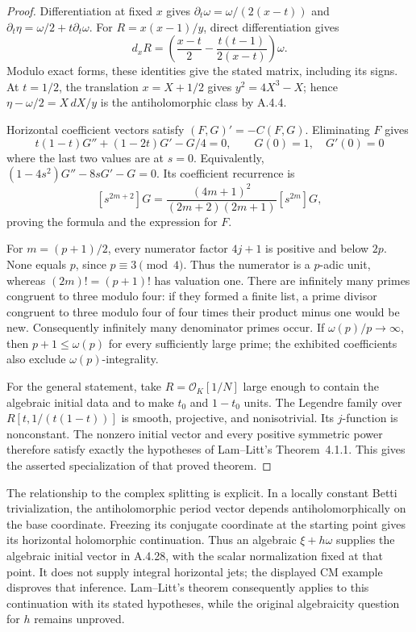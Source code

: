 \begin{proof}
Differentiation at fixed $x$ gives
$\partial_t\omega=\omega/(2(x-t))$ and
$\partial_t\eta=\omega/2+t\partial_t\omega$.
For $R=x(x-1)/y$, direct differentiation gives
\[
 d_xR=\left(\frac{x-t}{2}
       -\frac{t(t-1)}{2(x-t)}\right)\omega.
\]
Modulo exact forms, these identities give the stated matrix, including its signs.
At $t=1/2$, the translation $x=X+1/2$ gives $y^2=4X^3-X$; hence $\eta-\omega/2=X\,dX/y$ is the antiholomorphic class by A.4.4.

Horizontal coefficient vectors satisfy $(F,G)'=-C(F,G)$. Eliminating $F$ gives
\[
 t(1-t)G''+(1-2t)G'-G/4=0,
 \qquad G(0)=1,\quad G'(0)=0
\]
where the last two values are at $s=0$. Equivalently,
$(1-4s^2)G''-8sG'-G=0$. Its coefficient recurrence is
\[
 [s^{2m+2}]G=\frac{(4m+1)^2}{(2m+2)(2m+1)}[s^{2m}]G,
\]
proving the formula and the expression for $F$.

For $m=(p+1)/2$, every numerator factor $4j+1$ is positive and below $2p$. None equals $p$, since $p\equiv3\pmod4$. Thus the numerator is a $p$-adic unit, whereas $(2m)!=(p+1)!$ has valuation one. There are infinitely many primes congruent to three modulo four: if they formed a finite list, a prime divisor congruent to three modulo four of four times their product minus one would be new. Consequently infinitely many denominator primes occur. If $\omega(p)/p\to\infty$, then $p+1\le\omega(p)$ for every sufficiently large prime; the exhibited coefficients also exclude $\omega(p)$-integrality.

For the general statement, take $R=\mathcal O_K[1/N]$ large enough to contain the algebraic initial data and to make $t_0$ and $1-t_0$ units. The Legendre family over $R[t,1/(t(1-t))]$ is smooth, projective, and nonisotrivial. Its $j$-function is nonconstant. The nonzero initial vector and every positive symmetric power therefore satisfy exactly the hypotheses of Lam--Litt's Theorem~4.1.1. This gives the asserted specialization of that proved theorem.
\end{proof}

The relationship to the complex splitting is explicit. In a locally constant Betti trivialization, the antiholomorphic period vector depends antiholomorphically on the base coordinate. Freezing its conjugate coordinate at the starting point gives its horizontal holomorphic continuation. Thus an algebraic $\xi+h\omega$ supplies the algebraic initial vector in A.4.28, with the scalar normalization fixed at that point. It does not supply integral horizontal jets; the displayed CM example disproves that inference. Lam--Litt's theorem consequently applies to this continuation with its stated hypotheses, while the original algebraicity question for $h$ remains unproved.

